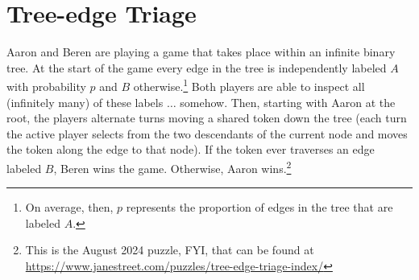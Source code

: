 \documentclass{book}
\theoremstyle{definition}
\theoremstyle{colonstylebf}
\begin{document}
\chapter{Tree-edge Triage}\label{statement}
\noindent Aaron and Beren are playing a game that takes place within an infinite binary tree. At the start of the game every edge in the tree is independently labeled $A$ with probability $p$  and $B$ otherwise.\footnote{On average, then, $p$ represents the proportion of edges in the tree that are labeled $A$.} Both players are able to inspect all (infinitely many) of these labels $\ldots$ somehow. Then, starting with Aaron at the root, the players alternate turns moving a shared token down the tree (each turn the active player selects from the two descendants of the current node and moves the token along the edge to that node). If the token ever traverses an edge labeled $B$, Beren wins the game. Otherwise, Aaron wins.\footnote{This is the August 2024 puzzle, FYI, that can be found at \url{https://www.janestreet.com/puzzles/tree-edge-triage-index/}}
\end{document}
